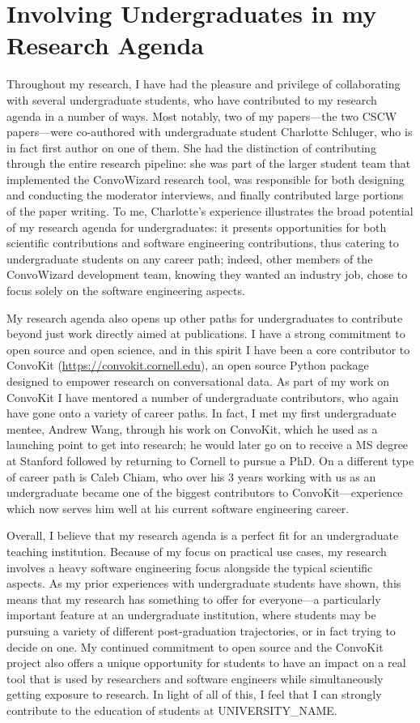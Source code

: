 \documentclass[12pt,letterpaper]{article}
\begin{document}
\section{Involving Undergraduates in my Research Agenda}
Throughout my research, I have had the pleasure and privilege of collaborating with several undergraduate students, who have contributed to my research agenda in a number of ways.
Most notably, two of my papers---the two CSCW papers---were co-authored with undergraduate student Charlotte Schluger, who is in fact first author on one of them.
She had the distinction of contributing through the entire research pipeline: she was part of the larger student team that implemented the ConvoWizard research tool, was responsible for both designing and conducting the moderator interviews, and finally contributed large portions of the paper writing.
To me, Charlotte's experience illustrates the broad potential of my research agenda for undergraduates: it presents opportunities for both scientific contributions and software engineering contributions, thus catering to undergraduate students on any career path; indeed, other members of the ConvoWizard development team, knowing they wanted an industry job, chose to focus solely on the software engineering aspects.

My research agenda also opens up other paths for undergraduates to contribute beyond just work directly aimed at publications.
I have a strong commitment to open source and open science, and in this spirit I have been a core contributor to ConvoKit (\url{https://convokit.cornell.edu}), an open source Python package designed to empower research on conversational data.
As part of my work on ConvoKit I have mentored a number of undergraduate contributors, who again have gone onto a variety of career paths.
In fact, I met my first undergraduate mentee, Andrew Wang, through his work on ConvoKit, which he used as a launching point to get into research; he would later go on to receive a MS degree at Stanford followed by returning to Cornell to pursue a PhD.
On a different type of career path is Caleb Chiam, who over his 3 years working with us as an undergraduate became one of the biggest contributors to ConvoKit---experience which now serves him well at his current software engineering career.

Overall, I believe that my research agenda is a perfect fit for an undergraduate teaching institution.
Because of my focus on practical use cases, my research involves a heavy software engineering focus alongside the typical scientific aspects.
As my prior experiences with undergraduate students have shown, this means that my research has something to offer for everyone---a particularly important feature at an undergraduate institution, where students may be pursuing a variety of different post-graduation trajectories, or in fact trying to decide on one.
My continued commitment to open source and the ConvoKit project also offers a unique opportunity for students to have an impact on a real tool that is used by researchers and software engineers while simultaneously getting exposure to research.
In light of all of this, I feel that I can strongly contribute to the education of students at UNIVERSITY\_NAME.

\vspace{0.5\baselineskip}


\end{document}
